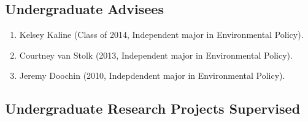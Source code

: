 \documentclass[10pt]{article}
\begin{document}
	\subsection{Undergraduate Advisees}
	\begin{enumerate}
	\item Kelsey Kaline (Class of 2014, Independent major in Environmental Policy).
	\item Courtney van Stolk (2013, Independent major in Environmental Policy).
	\item Jeremy Doochin (2010, Indepdendent major in Environmental Policy).
	\end{enumerate}
	\subsection{Undergraduate Research Projects Supervised}
\end{document}
